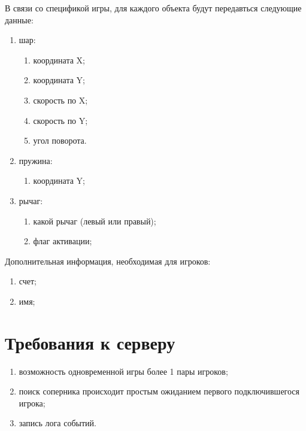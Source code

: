 В связи со спецификой игры, для каждого объекта будут передавться следующие данные:
\begin{enumerate}
\item шар:
	\begin{enumerate}
	\item координата X;
	\item координата Y;
	\item скорость по X;
	\item скорость по Y;
	\item угол поворота.
	\end{enumerate}	
\item пружина:
	\begin{enumerate}
	\item координата Y;
	\end{enumerate}
\item рычаг:
	\begin{enumerate}
	\item какой рычаг (левый или правый);
	\item флаг активации;
	\end{enumerate}
\end{enumerate}

Дополнительная информация, необходимая для игроков:
\begin{enumerate}
\item счет;
\item имя;
\end{enumerate}

\section{Требования к серверу}

\begin{enumerate}
\item возможность одновременной игры более 1 пары игроков;
\item поиск соперника происходит простым ожиданием первого подключившегося игрока;
\item запись лога событий.
\end{enumerate}

